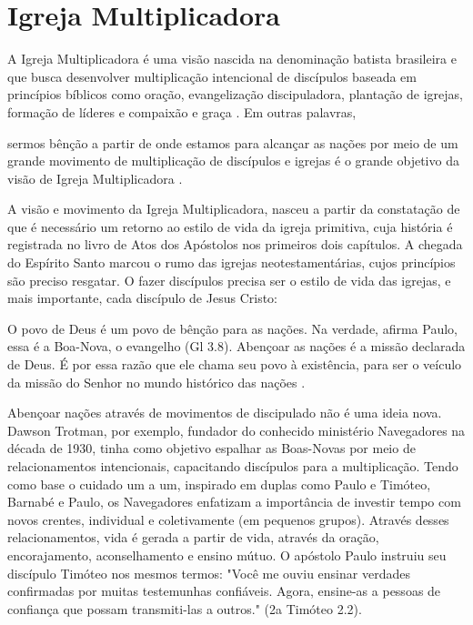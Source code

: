 \documentclass[12pt]{abntex2}
\begin{document}
\section{Igreja Multiplicadora}

A Igreja Multiplicadora é uma visão nascida na denominação batista brasileira e que busca desenvolver multiplicação intencional de discípulos baseada em princípios bíblicos como oração, evangelização discipuladora, plantação de igrejas, formação de líderes e compaixão e graça \cite{igrejaMultiplicVisaoSite}. Em outras palavras, 

\begin{citacao}sermos bênção a partir de onde estamos para alcançar as nações por meio de um grande movimento de multiplicação de discípulos e igrejas é o grande objetivo da visão de Igreja Multiplicadora \cite[p. 19]{freitas}.\end{citacao}

A visão e movimento da Igreja Multiplicadora, nasceu a partir da constatação de que é necessário um retorno ao estilo de vida da igreja primitiva, cuja história é registrada no livro de Atos dos Apóstolos nos primeiros dois capítulos. A chegada do Espírito Santo marcou o rumo das igrejas neotestamentárias, cujos princípios são preciso resgatar. O fazer discípulos precisa ser o estilo de vida das igrejas, e mais importante, cada discípulo de Jesus Cristo: 

\begin{citacao}O povo de Deus é um povo de bênção para as nações. Na verdade, afirma Paulo, essa é a Boa-Nova, o evangelho (Gl 3.8). Abençoar as nações é a missão declarada de Deus. É por essa razão que ele chama seu povo à existência, para ser o veículo da missão do Senhor no mundo histórico das nações \cite[p. 98]{wright_missao_2012}.\end{citacao}

Abençoar nações através de movimentos de discipulado não é uma ideia nova. Dawson Trotman, por exemplo, fundador do conhecido ministério Navegadores na década de 1930, tinha como objetivo espalhar as Boas-Novas por meio de relacionamentos intencionais, capacitando discípulos para a multiplicação. Tendo como base o cuidado um a um, inspirado em duplas como Paulo e Timóteo, Barnabé e Paulo, os Navegadores enfatizam a importância de investir tempo com novos crentes, individual e coletivamente (em pequenos grupos). Através desses relacionamentos, vida é gerada a partir de vida, através da oração, encorajamento, aconselhamento e ensino mútuo\cite[p. 21]{freitas}. O apóstolo Paulo instruiu seu discípulo Timóteo nos mesmos termos: "Você me ouviu ensinar verdades confirmadas por muitas testemunhas confiáveis. Agora, ensine-as a pessoas de confiança que possam transmiti-las a outros." (2a Timóteo 2.2).
\end{document}
